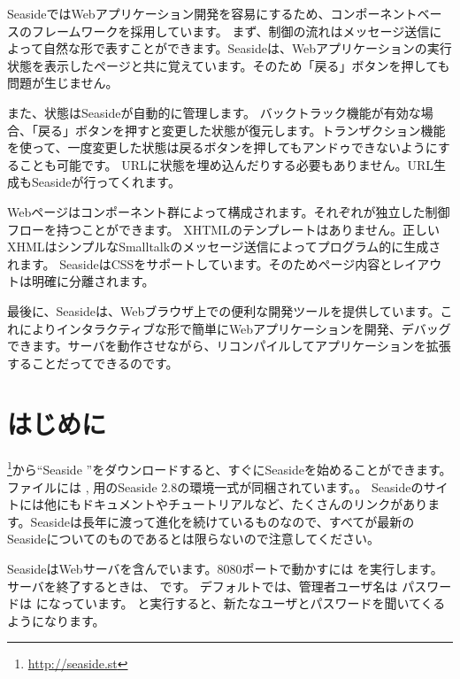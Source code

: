 \documentclass[a4paper,10pt,twoside]{book}
\begin{document}
SeasideではWebアプリケーション開発を容易にするため、コンポーネントベースのフレームワークを採用しています。
まず、制御の流れはメッセージ送信によって自然な形で表すことができます。Seasideは、Webアプリケーションの実行状態を表示したページと共に覚えています。そのため「戻る」ボタンを押しても問題が生じません。

また、状態はSeasideが自動的に管理します。
バックトラック機能が有効な場合、「戻る」ボタンを押すと変更した状態が復元します。トランザクション機能を使って、一度変更した状態は戻るボタンを押してもアンドゥできないようにすることも可能です。
URLに状態を埋め込んだりする必要もありません。URL生成もSeasideが行ってくれます。

Webページはコンポーネント群によって構成されます。それぞれが独立した制御フローを持つことができます。
XHTMLのテンプレートはありません。正しいXHMLはシンプルなSmalltalkのメッセージ送信によってプログラム的に生成されます。
SeasideはCSSをサポートしています。そのためページ内容とレイアウトは明確に分離されます。

最後に、Seasideは、Webブラウザ上での便利な開発ツールを提供しています。これによりインタラクティブな形で簡単にWebアプリケーションを開発、デバッグできます。サーバを動作させながら、リコンパイルしてアプリケーションを拡張することだってできるのです。
\section{はじめに}

\footnote{\url{http://seaside.st}}から``Seaside ''をダウンロードすると、すぐにSeasideを始めることができます。
ファイルには ,  用のSeaside 2.8の環境一式が同梱されています。。
Seasideのサイトには他にもドキュメントやチュートリアルなど、たくさんのリンクがあります。Seasideは長年に渡って進化を続けているものなので、すべてが最新のSeasideについてのものであるとは限らないので注意してください。


SeasideはWebサーバを含んでいます。8080ポートで動かすには   を実行します。
サーバを終了するときは、 です。
デフォルトでは、管理者ユーザ名は  パスワードは になっています。
   と実行すると、新たなユーザとパスワードを聞いてくるようになります。
\end{document}
